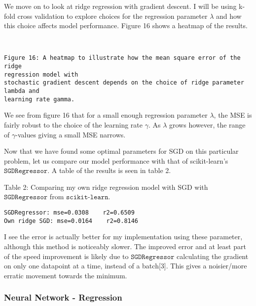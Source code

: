 \documentclass[11pt]{article}
\begin{document}
    We move on to look at ridge regression with gradient descent. I will be
using k-fold cross validation to explore choices for the regression
parameter \(\lambda\) and how this choice affects model performance.
Figure 16 shows a heatmap of the results.

        
    \begin{center}
    \end{center}
    { \hspace*{\fill} \\}
    
    \begin{Verbatim}[commandchars=\\\{\}]
Figure 16: A heatmap to illustrate how the mean square error of the ridge
regression model with
stochastic gradient descent depends on the choice of ridge parameter lambda and
learning rate gamma.
    \end{Verbatim}

    We see from figure 16 that for a small enough regression parameter
\(\lambda\), the MSE is fairly robust to the choice of the learning rate
\(\gamma\). As \(\lambda\) grows however, the range of \(\gamma\)-values
giving a small MSE narrows.

    Now that we have found some optimal parameters for SGD on this
particular problem, let us compare our model performance with that of
scikit-learn's \(\texttt{SGDRegressor}\). A table of the results is seen
in table 2.

    Table 2: Comparing my own ridge regression model with SGD with
\(\texttt{SGDRegressor}\) from \(\texttt{scikit-learn}\).

    \begin{Verbatim}[commandchars=\\\{\}]
SGDRegressor: mse=0.0308    r2=0.6509
Own ridge SGD: mse=0.0164    r2=0.8146
    \end{Verbatim}

    I see the error is actually better for my implementation using these
parameter, although this method is noticeably slower. The improved error
and at least part of the speed improvement is likely due to
\(\texttt{SGDRegressor}\) calculating the gradient on only one datapoint
at a time, instead of a batch{[}3{]}. This gives a noisier/more erratic
movement towards the minimum.

    \hypertarget{neural-network---regression}{%
\subsubsection{Neural Network -
Regression}\label{neural-network---regression}}
\end{document}
